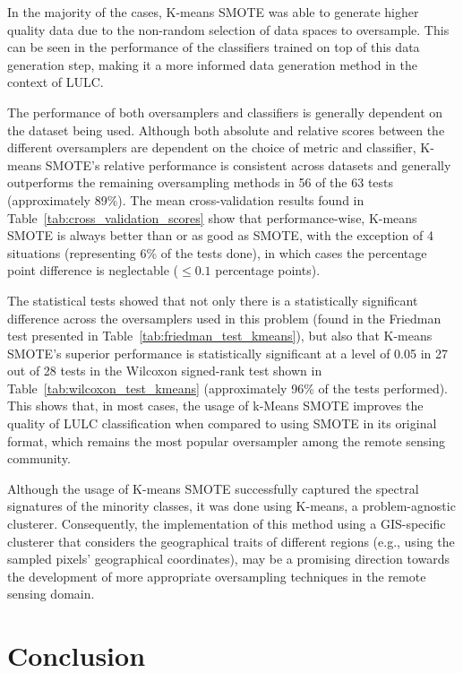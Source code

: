 In the majority of the cases, K-means SMOTE was able to generate higher
quality data due to the non-random selection of data spaces to oversample.
This can be seen in the performance of the classifiers trained on top of this
data generation step, making it a more informed data generation method in the
context of LULC\@.

The performance of both oversamplers and classifiers is generally dependent on
the dataset being used. Although both absolute and relative scores between the
different oversamplers are dependent on the choice of metric and classifier,
K-means SMOTE's relative performance is consistent across datasets and
generally outperforms the remaining oversampling methods in 56 of the 63 tests
(approximately 89\%). The mean cross-validation results found in
Table~\ref{tab:cross_validation_scores} show that performance-wise, K-means
SMOTE is always better than or as good as SMOTE, with the exception of 4
situations (representing 6\% of the tests done), in which cases the percentage
point difference is neglectable ($\leq 0.1$ percentage points). 

The statistical tests showed that not only there is a statistically
significant difference across the oversamplers used in this problem (found in
the Friedman test presented in Table~\ref{tab:friedman_test_kmeans}), but also that
K-means SMOTE's superior performance is statistically significant at a level
of 0.05 in 27 out of 28 tests in the Wilcoxon signed-rank test shown in
Table~\ref{tab:wilcoxon_test_kmeans} (approximately 96\% of the tests performed).
This shows that, in most cases, the usage of k-Means SMOTE improves the
quality of LULC classification when compared to using SMOTE in its original
format, which remains the most popular oversampler among the remote sensing
community.

Although the usage of K-means SMOTE successfully captured the spectral
signatures of the minority classes, it was done using K-means, a
problem-agnostic clusterer. Consequently, the implementation of this method
using a GIS-specific clusterer that considers the geographical traits of
different regions (e.g., using the sampled pixels' geographical coordinates),
may be a promising direction towards the development of more appropriate
oversampling techniques in the remote sensing domain.

\section{Conclusion}~\label{sec:conclusion-kmeans} 

